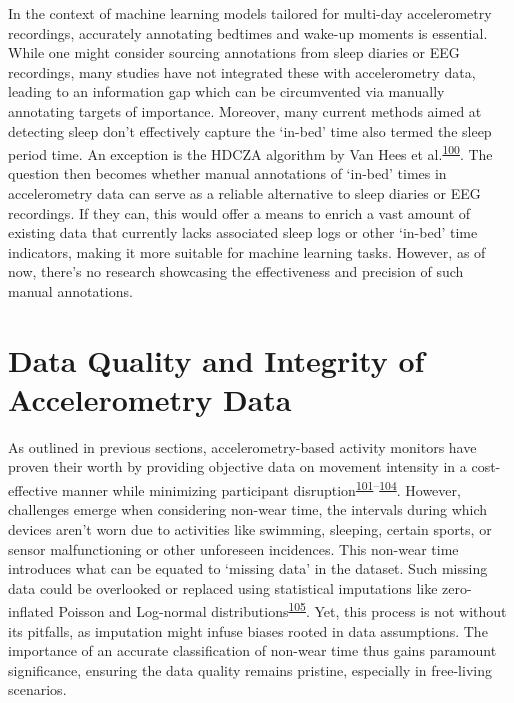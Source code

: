 \documentclass[
  10pt,
]{scrbook}
\begin{document}
In the context of machine learning models tailored for multi-day
accelerometry recordings, accurately annotating bedtimes and wake-up
moments is essential. While one might consider sourcing annotations from
sleep diaries or EEG recordings, many studies have not integrated these
with accelerometry data, leading to an information gap which can be
circumvented via manually annotating targets of importance. Moreover,
many current methods aimed at detecting sleep don't effectively capture
the `in-bed' time also termed the sleep period time. An exception is the
HDCZA algorithm by Van Hees et
al.\textsuperscript{\protect\hyperlink{ref-van_hees_estimating_2018}{100}}.
The question then becomes whether manual annotations of `in-bed' times
in accelerometry data can serve as a reliable alternative to sleep
diaries or EEG recordings. If they can, this would offer a means to
enrich a vast amount of existing data that currently lacks associated
sleep logs or other `in-bed' time indicators, making it more suitable
for machine learning tasks. However, as of now, there's no research
showcasing the effectiveness and precision of such manual annotations.

\hypertarget{data-quality-and-integrity-of-accelerometry-data}{%
\section{Data Quality and Integrity of Accelerometry
Data}\label{data-quality-and-integrity-of-accelerometry-data}}

As outlined in previous sections, accelerometry-based activity monitors
have proven their worth by providing objective data on movement
intensity in a cost-effective manner while minimizing participant
disruption\textsuperscript{\protect\hyperlink{ref-dowd_systematic_2018}{101}--\protect\hyperlink{ref-migueles_comparability_2019}{104}}.
However, challenges emerge when considering non-wear time, the intervals
during which devices aren't worn due to activities like swimming,
sleeping, certain sports, or sensor malfunctioning or other unforeseen
incidences. This non-wear time introduces what can be equated to
`missing data' in the dataset. Such missing data could be overlooked or
replaced using statistical imputations like zero-inflated Poisson and
Log-normal
distributions\textsuperscript{\protect\hyperlink{ref-lee_missing_2018}{105}}.
Yet, this process is not without its pitfalls, as imputation might
infuse biases rooted in data assumptions. The importance of an accurate
classification of non-wear time thus gains paramount significance,
ensuring the data quality remains pristine, especially in free-living
scenarios.
\end{document}
